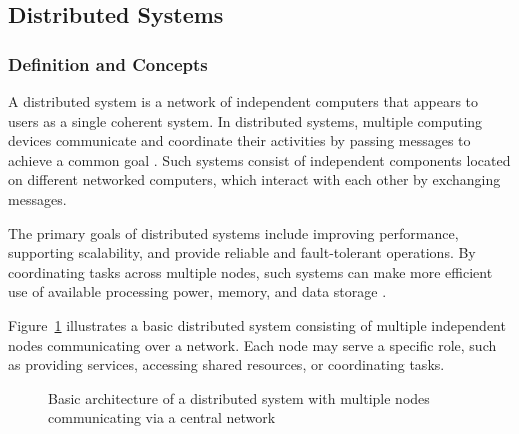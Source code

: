 \subsection{Distributed Systems}

\subsubsection{Definition and Concepts}

A distributed system is a network of independent computers that appears to users as a single coherent system. In distributed systems, multiple computing devices communicate and coordinate their activities by passing messages to achieve a common goal \cite{tanenbaum2017}. Such systems consist of independent components located on different networked computers, which interact with each other by exchanging messages.

\vspace{1em}
The primary goals of distributed systems include improving performance, supporting scalability, and provide reliable and fault-tolerant operations. By coordinating tasks across multiple nodes, such systems can make more efficient use of available processing power, memory, and data storage \cite{coulouris2012}.

\vspace{1em}
Figure~\ref{fig:distributed_architecture} illustrates a basic distributed system consisting of multiple independent nodes communicating over a network. Each node may serve a specific role, such as providing services, accessing shared resources, or coordinating tasks.

\begin{figure}[H]
	\centering
	\caption{Basic architecture of a distributed system with multiple nodes communicating via a central network}
	\label{fig:distributed_architecture}
\end{figure}


